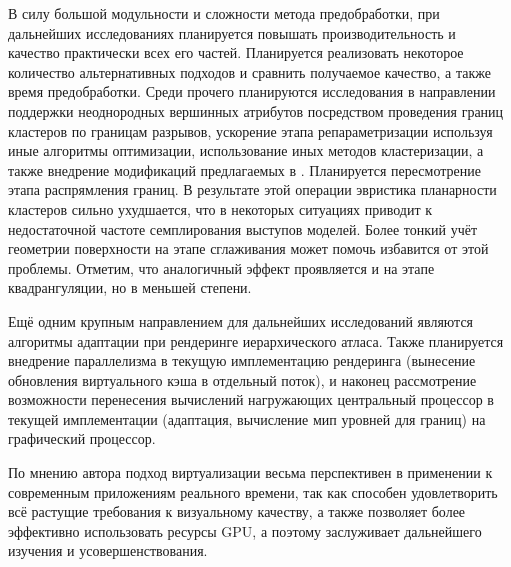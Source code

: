 \documentclass[12pt]{extarticle}
\begin{document}
В силу большой модульности и сложности метода предобработки, при дальнейших исследованиях планируется повышать производительность и качество практически всех его частей. Планируется реализовать некоторое количество альтернативных подходов и сравнить получаемое качество, а также время предобработки. Среди прочего планируются исследования в направлении поддержки неоднородных вершинных атрибутов посредством проведения границ кластеров по границам разрывов, ускорение этапа репараметризации используя иные алгоритмы оптимизации, использование иных методов кластеризации, а также внедрение модификаций предлагаемых в \cite{feng2010feature}. Планируется пересмотрение этапа распрямления границ. В результате этой операции эвристика планарности кластеров сильно ухудшается, что в некоторых ситуациях приводит к недостаточной частоте семплирования выступов моделей. Более тонкий учёт геометрии поверхности на этапе сглаживания может помочь избавится от этой проблемы. Отметим, что аналогичный эффект проявляется и на этапе квадрангуляции, но в меньшей степени.

Ещё одним крупным направлением для дальнейших исследований являются алгоритмы адаптации при рендеринге иерархического атласа. Также планируется внедрение параллелизма в текущую имплементацию рендеринга (вынесение обновления виртуального кэша в отдельный поток), и наконец рассмотрение возможности перенесения вычислений нагружающих центральный процессор в текущей имплементации (адаптация, вычисление мип уровней для границ) на графический процессор.

По мнению автора подход виртуализации весьма перспективен в применении к современным приложениям реального времени, так как способен удовлетворить всё растущие требования к визуальному качеству, а также позволяет более эффективно использовать ресурсы GPU, а поэтому заслуживает дальнейшего изучения и усовершенствования.

\newpage

\end{document}
